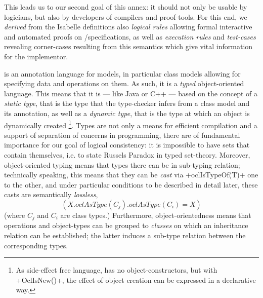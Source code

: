 This leads us to our second goal of this annex: it should not only be
usable by logicians, but also by developers of compilers and
proof-tools. For this end, we \emph{derived} from the Isabelle
definitions also \emph{logical rules} allowing formal interactive and
automated proofs on \UML/\OCL specifications, as well as
\emph{execution rules} and \emph{test-cases} revealing corner-cases
resulting from this semantics which give vital information for the
implementor.

\OCL is an annotation language for \UML models, in particular class
models allowing for specifying data and operations on them. As such,
it is a \emph{typed} object-oriented language. This means that it is
--- like Java or C++ --- based on the concept of a \emph{static type},
that is the type that the type-checker infers from a \UML class model
and its \OCL annotation, as well as a \emph{dynamic type}, that is the
type at which an object is dynamically created \footnote{As
  side-effect free language, \OCL has no object-constructors, but with
  \inlineocl+OclIsNew()+, the effect of object creation can be
  expressed in a declarative way.}. Types are not only a means for
efficient compilation and a support of separation of concerns in
programming, there are of fundamental importance for our goal of
logical consistency: it is impossible to have sets that contain
themselves, i.e. to state Russels Paradox in \OCL typed set-theory.
Moreover, object-oriented typing means that types there can be in
sub-typing relation; technically speaking, this means that they can be
\emph{cast} via \inlineocl+oclIsTypeOf(T)+ one to the other, and
under particular conditions to be described in detail later, these
casts are semantically \emph{lossless}, \ie{}
\begin{equation}
 (X.oclAsType(C_j).oclAsType(C_i) = X)
\end{equation}
(where $C_j$ and $C_i$ are class types.)
Furthermore, object-orientedness means that operations and object-types can be
grouped to \emph{classes} on which an inheritance relation can be established;
the latter induces a sub-type relation between the corresponding types.

